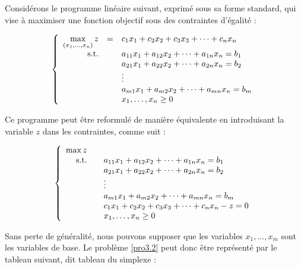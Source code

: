 \documentclass[a4paper,12pt,openany]{book}
\theoremstyle{plain}
\theoremstyle{definition}
\theoremstyle{remark}
\theoremstyle{nbstyle}
\begin{document}
	Considérons le programme linéaire suivant, exprimé sous sa forme standard, qui vise à maximiser une fonction objectif sous des contraintes d'égalité :
	
	\[
	\left\{
	\begin{array}{rcl}
	\displaystyle \displaystyle\max_{\left(x_{1}, \ldots, x_{n}\right)} z & = & c_{1} x_{1} + c_{2} x_{2} + c_{3} x_{3} + \cdots + c_{n} x_{n} \\
	\text{s.t.} & & a_{11} x_{1} + a_{12} x_{2} + \cdots + a_{1n} x_{n} = b_{1} \\
	& & a_{21} x_{1} + a_{22} x_{2} + \cdots + a_{2n} x_{n} = b_{2} \\
	& & \vdots \\
	& & a_{m1} x_{1} + a_{m2} x_{2} + \cdots + a_{mn} x_{n} = b_{m} \\
	& & x_{1}, \ldots, x_{n} \geq 0
	\end{array}
	\right.
	\]
	
	Ce programme peut être reformulé de manière équivalente en introduisant la variable $z$ dans les contraintes, comme suit :
	
	\begin{equation}\label{pro3.2}
	\left\{
	\begin{array}{rcl}
	\displaystyle \displaystyle\max z & & \\
	\text{s.t.} & & a_{11} x_{1} + a_{12} x_{2} + \cdots + a_{1n} x_{n} = b_{1} \\
	& & a_{21} x_{1} + a_{22} x_{2} + \cdots + a_{2n} x_{n} = b_{2} \\
	& & \vdots \\
	& & a_{m1} x_{1} + a_{m2} x_{2} + \cdots + a_{mn} x_{n} = b_{m} \\
	& & c_{1} x_{1} + c_{2} x_{2} + c_{3} x_{3} + \cdots + c_{n} x_{n} - z = 0 \\
	& & x_{1}, \ldots, x_{n} \geq 0
	\end{array}
	\right.
	\end{equation}
	
	Sans perte de généralité, nous pouvons supposer que les variables $x_{1}, \ldots, x_{m}$ sont les variables de base. Le problème \eqref{pro3.2} peut donc être représenté par le tableau suivant, dit tableau du simplexe :
	
\end{document}

